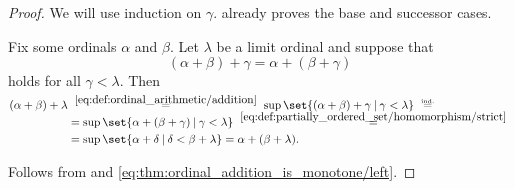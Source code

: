 \begin{proof}
   We will use induction on \( \gamma \).  already proves the base and successor cases.

  Fix some ordinals \( \alpha \) and \( \beta \). Let \( \lambda \) be a limit ordinal and suppose that
  \begin{equation*}
    (\alpha + \beta) + \gamma = \alpha + (\beta + \gamma)
  \end{equation*}
  holds for all \( \gamma < \lambda \). Then
  \begin{align*}
    (\alpha + \beta) + \lambda
    &\reloset {\eqref{eq:def:ordinal_arithmetic/addition}} =
    \sup\set{ (\alpha + \beta) + \gamma \given \gamma < \lambda }
    \reloset {\T{ind.}} = \\ &=
    \sup\set{ \alpha + (\beta + \gamma) \given \gamma < \lambda }
    \reloset {\eqref{eq:def:partially_ordered_set/homomorphism/strict}} = \\ &=
    \sup\set{ \alpha + \delta \given \delta < \beta + \lambda }
    =
    \alpha + (\beta + \lambda).
  \end{align*}

   Follows from  and \eqref{eq:thm:ordinal_addition_is_monotone/left}.
\end{proof}

